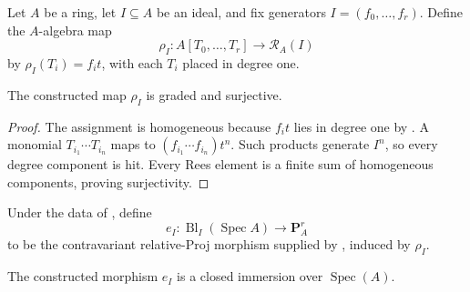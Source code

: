 \begin{definition}
  \label{def:nagata-rees-polynomial-map}
  \leanok

  Let $A$ be a ring, let $I\subseteq A$ be an ideal, and fix generators
  $I=(f_0,\ldots,f_r)$.  Define the $A$-algebra map
  \[
    \rho_I\colon A[T_0,\ldots,T_r]\longrightarrow\mathcal R_A(I)
  \]
  by $\rho_I(T_i)=f_it$, with each $T_i$ placed in degree one.
\end{definition}

\begin{lemma}
  \label{lemma:nagata-rees-polynomial-surjection}
  \leanok

  The constructed map $\rho_I$ is graded and surjective.
\end{lemma}

\begin{proof}
  \leanok
  The assignment is homogeneous because $f_it$ lies in degree one by
  .  A monomial
  $T_{i_1}\cdots T_{i_n}$ maps to
  $(f_{i_1}\cdots f_{i_n})t^n$.  Such products generate $I^n$, so every
  degree component is hit.  Every Rees element is a finite sum of homogeneous
  components, proving surjectivity.
\end{proof}

\begin{definition}
  \label{def:nagata-affine-blowup-projective-embedding}
  \leanok

  Under the data of , define
  \[
    e_I\colon\operatorname{Bl}_I(\operatorname{Spec}A)
      \longrightarrow\mathbf P^r_A
  \]
  to be the contravariant relative-Proj morphism supplied by
  , induced by $\rho_I$.
\end{definition}

\begin{lemma}
  \label{lemma:nagata-affine-blowup-projective-embedding}
  \leanok

  The constructed morphism $e_I$ is a closed immersion over
  $\operatorname{Spec}(A)$.
\end{lemma}

